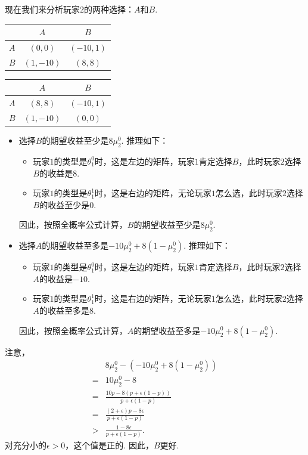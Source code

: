 现在我们来分析玩家$2$的两种选择：$A$和$B$.
\begin{table}[ht]
    \centering
\begin{tabular}{c|cc}
&$A$ & $B$ \\
\hline
$A$ & $(0, 0)$ & $(-10, 1)$ \\
$B$ & $(1, -10)$ & $(8, 8)$ \\
\end{tabular}
\qquad
\begin{tabular}{c|cc}
&$A$ & $B$ \\
\hline
$A$ & $(8, 8)$ & $(-10, 1)$ \\
$B$ & $(1, -10)$ & $(0, 0)$ \\
\end{tabular}
\end{table}
\begin{itemize}
    \item 选择$B$的期望收益至少是$8\mu_2^0$. 推理如下：
    \begin{itemize}
        \item 玩家$1$的类型是$\theta_1^0$时，这是左边的矩阵，玩家$1$肯定选择$B$，此时玩家$2$选择$B$的收益是$8$.
        \item 玩家$1$的类型是$\theta_1^1$时，这是右边的矩阵，无论玩家$1$怎么选，此时玩家$2$选择$B$的收益至少是$0$.
    \end{itemize}
    因此，按照全概率公式计算，$B$的期望收益至少是$8\mu_2^0$.
    \item 选择$A$的期望收益至多是$-10\mu_2^0 + 8(1 - \mu_2^0)$. 推理如下：
    \begin{itemize}
        \item 玩家$1$的类型是$\theta_1^0$时，这是左边的矩阵，玩家$1$肯定选择$B$，此时玩家$2$选择$A$的收益是$-10$.
        \item 玩家$1$的类型是$\theta_1^1$时，这是右边的矩阵，无论玩家$1$怎么选，此时玩家$2$选择$A$的收益至多是$8$.
    \end{itemize}
    因此，按照全概率公式计算，$A$的期望收益至多是$-10\mu_2^0 + 8(1 - \mu_2^0)$.
\end{itemize}

注意，
\begin{align*}
    &8\mu_2^0-(-10\mu_2^0 + 8(1 - \mu_2^0))\\
    =& 10\mu_2^0 - 8\\
    =& \frac{10p-8(p+\epsilon(1-p))}{p+\epsilon(1-p)}\\
    =& \frac{(2+\epsilon)p-8\epsilon}{p+\epsilon(1-p)}\\
    >& \frac{1-8\epsilon}{p+\epsilon(1-p)}.
\end{align*}
对充分小的$\epsilon>0$，这个值是正的. 因此，$B$更好.

